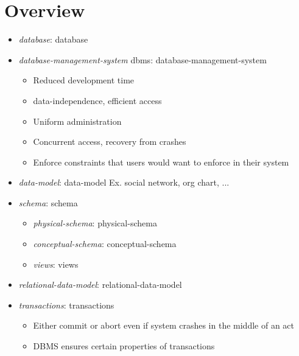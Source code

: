\chapter{Overview}

\begin{itemize}
  \item \emph{\Gls{database}}: \glsdesc{database}
  \item \emph{\Gls{database-management-system}} \acrshort{dbms}:
  \glsdesc{database-management-system}
  \begin{itemize}
    \item Reduced development time
    \item \Gls{data-independence}, efficient access
    \item Uniform administration
    \item Concurrent access, recovery from crashes
    \item Enforce constraints that users would want to enforce in their system
  \end{itemize}

  \item \emph{\Gls{data-model}}: \glsdesc{data-model} Ex. social network,
  org chart, ...
  \item \emph{\Gls{schema}}: \glsdesc{schema}
  \begin{itemize}
    \item \emph{\Gls{physical-schema}}: \glsdesc{physical-schema}
    \item \emph{\Gls{conceptual-schema}}: \glsdesc{conceptual-schema}
    \item \emph{\Gls{views}}: \glsdesc{views}
  \end{itemize}

  \item \emph{\Gls{relational-data-model}}: \glsdesc{relational-data-model}
  \item \emph{\Gls{transactions}}: \gls{transactions}
  \begin{itemize}
    \item Either commit or abort even if system crashes in the middle of an act
    \item DBMS ensures certain properties of transactions
  \end{itemize}
\end{itemize}
